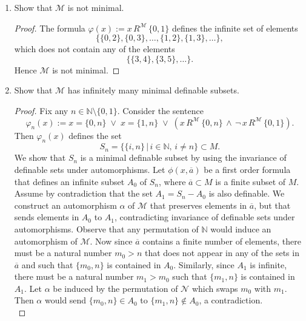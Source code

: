 \documentclass{article}
\begin{document}
\begin{enumerate}
    \begin{enumerate}
      \item Show that $\mathcal{M}$ is not minimal.
        \begin{proof}
          The formula $\varphi(x):=x\,R^{\mathcal{M}}\,\{0,1\}$
          defines the infinite set of elements
          \begin{equation*}
            \{\{0,2\},\{0,3\},\ldots,\{1,2\},\{1,3\},\ldots\},
          \end{equation*}
          which does not contain any of the elements
          \begin{equation*}
            \{\{3,4\},\{3,5\},\ldots\}.
          \end{equation*}
          Hence $\mathcal{M}$ is not minimal.
        \end{proof}

      \item Show that $\mathcal{M}$ has infinitely many minimal
        definable subsets.
        \begin{proof}
          Fix any $n\in\mathbb{N}\setminus\{0,1\}$. Consider the
          sentence
          \begin{equation*}
            \varphi_n(x) := x=\{0,n\}\;\vee\; x=\{1,n\}\;\vee\;
            (x\,R^{\mathcal{M}}\, \{0,n\}\,\wedge\,
            \neg\,x\,R^{\mathcal{M}}\,\{0,1\}).
          \end{equation*}
          Then $\varphi_n(x)$ defines the set
          \begin{equation*}
            S_n = \{\{i,n\}\,|\, i\in\mathbb{N},\,i\neq n\}\subset M.
          \end{equation*}
          We show that $S_n$ is a minimal definable subset by using the
          invariance of definable sets under automorphisms. Let
          $\phi(x,\overline{a})$ be a first order formula that defines
          an infinite subset $A_0$ of $S_n$, where $\overline{a}\subset
          M$ is a finite subset of $M$. Assume by contradiction that
          the set $A_1=S_n-A_0$ is also definable. We construct an
          automorphism $\alpha$ of $\mathcal{M}$ that preserves
          elements in $\overline{a}$, but that sends elements in $A_0$ to
          $A_1$, contradicting invariance of definable sets
          under automorphisms. Observe that any permutation of
          $\mathbb{N}$ would induce an automorphism of $\mathcal{M}$.
          Now since $\overline{a}$ contains a finite number of
          elements, there must be a natural number $m_0>n$ that does
          not appear in any of the sets in $\overline{a}$ and such that
          $\{m_0,n\}$ is contained in $A_0$. Similarly, since $A_1$ is
          infinite, there must be a natural number $m_1>m_0$ such that
          $\{m_1,n\}$ is contained in $A_1$. Let $\alpha$ be induced by
          the permutation of $\mathcal{N}$ which swaps $m_0$ with
          $m_1$. Then $\alpha$ would send $\{m_0,n\}\in A_0$ to
          $\{m_1,n\}\not\in A_0$, a contradiction. \\


\end{proof}
\end{enumerate}
\end{enumerate}
\end{document}
